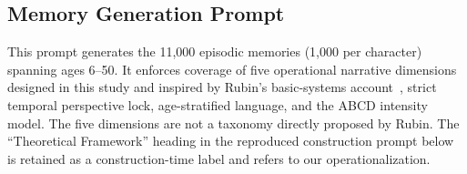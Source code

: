 \documentclass[11pt]{article}
\begin{document}
\subsection{Memory Generation Prompt}
\label{app:prompt_memory}

This prompt generates the 11,000 episodic memories (1,000 per character) spanning ages 6--50. It enforces coverage of five operational narrative dimensions designed in this study and inspired by Rubin's basic-systems account~\cite{rubin2006basic}, strict temporal perspective lock, age-stratified language, and the ABCD intensity model. The five dimensions are not a taxonomy directly proposed by Rubin. The ``Theoretical Framework'' heading in the reproduced construction prompt below is retained as a construction-time label and refers to our operationalization.
\end{document}
